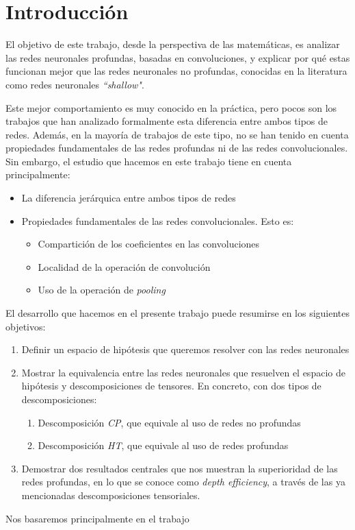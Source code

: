 
\chapter{Introducción}

El objetivo de este trabajo, desde la perspectiva de las matemáticas, es analizar las redes neuronales profundas, basadas en convoluciones, y explicar por qué estas funcionan mejor que las redes neuronales no profundas, conocidas en la literatura como redes neuronales \textit{``shallow"}.

Este mejor comportamiento es muy conocido en la práctica, pero pocos son los trabajos que han analizado formalmente esta diferencia entre ambos tipos de redes. Además, en la mayoría de trabajos de este tipo, no se han tenido en cuenta propiedades fundamentales de las redes profundas ni de las redes convolucionales. Sin embargo, el estudio que hacemos en este trabajo tiene en cuenta principalmente:

\begin{itemize}
    \item La diferencia jerárquica entre ambos tipos de redes
    \item Propiedades fundamentales de las redes convolucionales. Esto es:
        \begin{itemize}
            \item Compartición de los coeficientes en las convoluciones
            \item Localidad de la operación de convolución
            \item Uso de la operación de \textit{pooling}
        \end{itemize}
\end{itemize}

El desarrollo que hacemos en el presente trabajo puede resumirse en los siguientes objetivos:

\begin{enumerate}
    \item Definir un espacio de hipótesis que queremos resolver con las redes neuronales
    \item Mostrar la equivalencia entre las redes neuronales que resuelven el espacio de hipótesis y descomposiciones de tensores. En concreto, con dos tipos de descomposiciones:
        \begin{enumerate}
            \item Descomposición \textit{CP}, que equivale al uso de redes no profundas
            \item Descomposición \textit{HT}, que equivale al uso de redes profundas
        \end{enumerate}
    \item Demostrar dos resultados centrales que nos muestran la superioridad de las redes profundas, en lo que se conoce como \textit{depth efficiency}, a través de las ya mencionadas descomposiciones tensoriales.
\end{enumerate}

Nos basaremos principalmente en el trabajo \cite{matematicas:principal}


\endinput
